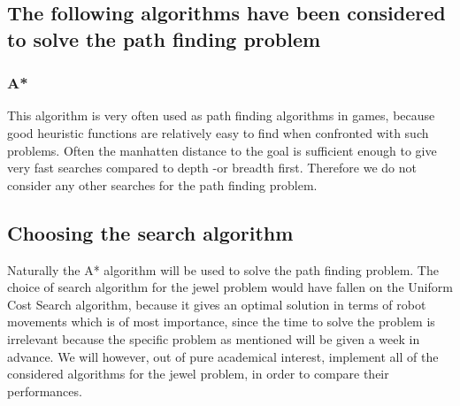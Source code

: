 \subsection*{The following algorithms have been considered to solve the path finding problem}
\subsubsection*{A*}
This algorithm is very often used as path finding algorithms in games, because good heuristic functions are relatively easy to find when confronted with such problems. Often the manhatten distance to the goal is sufficient enough to give very fast searches compared to depth -or breadth first. Therefore we do not consider any other searches for the path finding problem.

\subsection{Choosing the search algorithm}
Naturally the A* algorithm will be used to solve the path finding problem. The choice of search algorithm for the jewel problem would have fallen on the Uniform Cost Search algorithm, because it gives an optimal solution in terms of robot movements which is of most importance, since the time to solve the problem is irrelevant because the specific problem as mentioned will be given a week in advance. We will however, out of pure academical interest, implement all of the considered algorithms for the jewel problem, in order to compare their performances. 